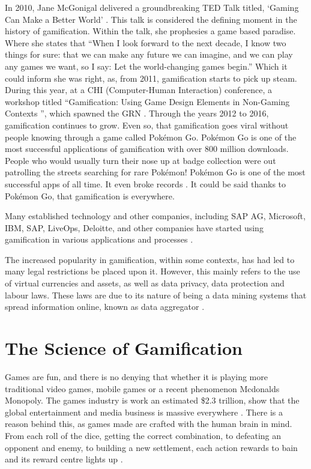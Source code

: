 		In 2010, Jane McGonigal delivered a groundbreaking TED Talk titled, ‘Gaming Can Make a Better World’ \cite{janeted}. This talk is considered the defining moment in the history of gamification. Within the talk, she prophesies a game based paradise. Where she states that “When I look forward to the next decade, I know two things for sure: that we can make any future we can imagine, and we can play any games we want, so I say: Let the world-changing games begin.\cite{janeted}” Which it could inform she was right, as, from 2011, gamification starts to pick up steam. During this year, at a CHI (Computer-Human Interaction) conference, a workshop titled “Gamification: Using Game Design Elements in Non-Gaming Contexts \cite{chi2011}”, which spawned the \ac{GRN} \cite{gamresearch}. Through the years 2012 to 2016, gamification continues to grow. Even so, that gamification goes viral without people knowing through a game called Pokémon Go. Pokémon Go is one of the most successful applications of gamification with over 800 million downloads. People who would usually turn their nose up at badge collection were out patrolling the streets searching for rare Pokémon! Pokémon Go is one of the most successful apps of all time. It even broke records \cite{pokegwr,history}. It could be said thanks to Pokémon Go, that gamification is everywhere.
		
		Many established technology and other companies, including SAP AG, Microsoft, IBM, SAP, LiveOps, Deloitte, and other companies have started using gamification in various applications and processes \cite{silv11}.
		
		The increased popularity in gamification, within some contexts, has had led to many legal restrictions be placed upon it. However, this mainly refers to the use of virtual currencies and assets, as well as data privacy, data protection and labour laws. These laws are due to its nature of being a data mining systems that spread information online, known as data aggregator \cite{gamelaw,dataagg}.

	\section{The Science of Gamification}
		\label{sec:google_fu}
		
		Games are fun, and there is no denying that whether it is playing more traditional video games, mobile games or a recent phenomenon Mcdonalds Monopoly. The games industry is work an estimated \$2.3 trillion, show that the global entertainment and media business is massive everywhere \cite{gamescience}. There is a reason behind this, as games made are crafted with the human brain in mind. From each roll of the dice, getting the correct combination, to defeating an opponent and enemy, to building a new settlement, each action rewards to bain and its reward centre lights up \cite{sciencebehind}.
		
